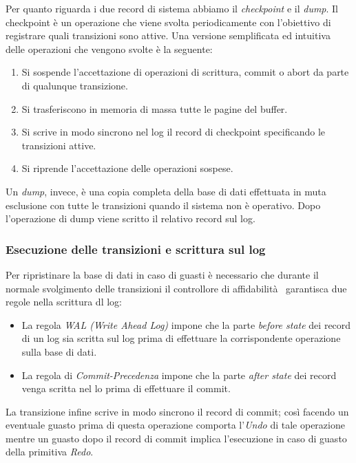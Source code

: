 Per quanto riguarda i due record di sistema abbiamo il \emph{checkpoint} e il \emph{dump}.
Il checkpoint è un operazione che viene svolta periodicamente con l'obiettivo di registrare quali transizioni sono attive. Una versione semplificata ed intuitiva delle operazioni che vengono svolte è la seguente:
\begin{enumerate}
\item Si sospende l'accettazione di operazioni di scrittura, commit o abort da parte di qualunque transizione.
\item Si trasferiscono in memoria di massa tutte le pagine del buffer.
\item Si scrive in modo sincrono nel log il record di checkpoint specificando le transizioni attive.
\item Si riprende l'accettazione delle operazioni sospese.
\end{enumerate}

Un \emph{dump}, invece, è una copia completa della base di dati effettuata in muta esclusione con tutte le transizioni quando il sistema non è operativo.
Dopo l'operazione di dump viene scritto il relativo record sul log.
\subsubsection{Esecuzione delle transizioni e scrittura sul log}
Per ripristinare la base di dati in caso di guasti è necessario che durante il normale svolgimento delle transizioni il controllore di affidabilità  garantisca due regole nella scrittura dl log:
\begin{itemize}
\item La regola \emph{WAL (Write Ahead Log)} impone che la parte \emph{before state} dei record di un log sia scritta sul log prima di effettuare la corrispondente operazione sulla base di dati.
\item La regola di \emph{Commit-Precedenza} impone che la parte \emph{after state} dei record venga scritta nel lo prima di effettuare il commit.
\end{itemize}
La transizione infine scrive in modo sincrono il record di commit; così facendo un eventuale guasto prima di questa operazione comporta l'\emph{Undo} di tale operazione mentre un guasto dopo il record di commit implica l'esecuzione in caso di guasto della primitiva \emph{Redo}.
